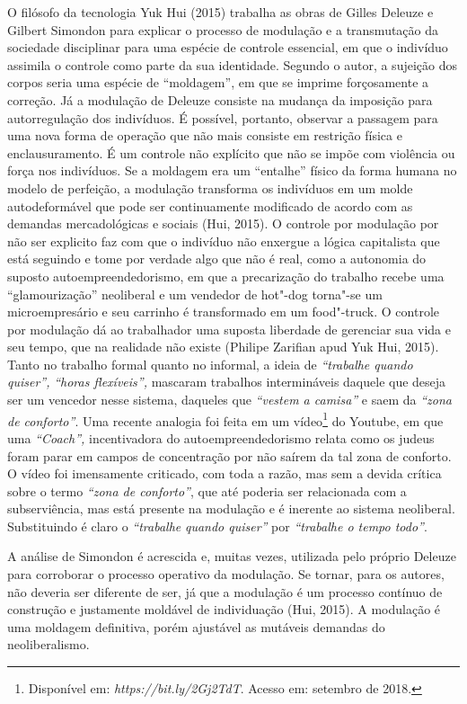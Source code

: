 O filósofo da tecnologia Yuk Hui (2015) trabalha as obras de Gilles
Deleuze e Gilbert Simondon para explicar o processo de modulação e a
transmutação da sociedade disciplinar para uma espécie de controle
essencial, em que o indivíduo assimila o controle como parte da sua
identidade. Segundo o autor, a sujeição dos corpos seria uma espécie de
``moldagem'', em que se imprime forçosamente a correção. Já a modulação
de Deleuze consiste na mudança da imposição para autorregulação dos
indivíduos. É possível, portanto, observar a passagem para uma nova
forma de operação que não mais consiste em restrição física e
enclausuramento. É um controle não explícito que não se impõe com
violência ou força nos indivíduos. Se a moldagem era um ``entalhe''
físico da forma humana no modelo de perfeição, a modulação transforma os
indivíduos em um molde autodeformável que pode ser continuamente
modificado de acordo com as demandas mercadológicas e sociais (Hui,
2015). O controle por modulação por não ser explicito faz com que o
indivíduo não enxergue a lógica capitalista que está seguindo e tome por
verdade algo que não é real, como a autonomia do suposto
autoempreendedorismo, em que a precarização do trabalho recebe uma
``glamourização'' neoliberal e um vendedor de hot"-dog torna"-se um
microempresário e seu carrinho é transformado em um food"-truck. O
controle por modulação dá ao trabalhador uma suposta liberdade de
gerenciar sua vida e seu tempo, que na realidade não existe (Philipe
Zarifian apud Yuk Hui, 2015). Tanto no trabalho formal quanto no
informal, a ideia de \emph{``trabalhe quando quiser'',} \emph{``horas
flexíveis'',} mascaram trabalhos intermináveis daquele que deseja ser um
vencedor nesse sistema, daqueles que \emph{``vestem a camisa''} e saem
da \emph{``zona de conforto''}. Uma recente analogia foi feita em um
vídeo\footnote{Disponível em: \emph{https://bit.ly/2Gj2TdT}.
  Acesso em: setembro de 2018.} do Youtube, em que uma \emph{``Coach'',}
incentivadora do autoempreendedorismo relata como os judeus foram parar
em campos de concentração por não saírem da tal zona de conforto. O
vídeo foi imensamente criticado, com toda a razão, mas sem a devida
crítica sobre o termo \emph{``zona de conforto''}, que até poderia ser
relacionada com a subserviência, mas está presente na modulação e é
inerente ao sistema neoliberal. Substituindo é claro o \emph{``trabalhe}
\emph{quando quiser''} por \emph{``trabalhe o tempo todo''}.

A análise de Simondon é acrescida e, muitas vezes, utilizada pelo
próprio Deleuze para corroborar o processo operativo da modulação. Se
tornar, para os autores, não deveria ser diferente de ser, já que a
modulação é um processo contínuo de construção e justamente moldável de
individuação (Hui, 2015). A modulação é uma moldagem definitiva,
porém ajustável as mutáveis demandas do neoliberalismo.

